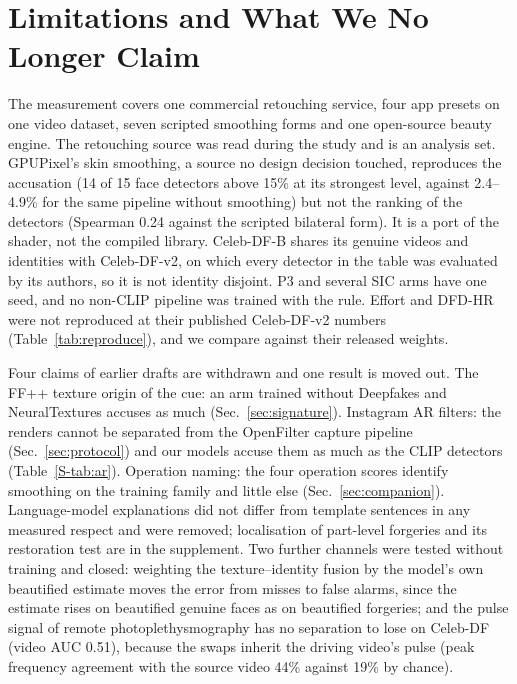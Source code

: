 \documentclass[journal]{IEEEtran}  %
\begin{document}
\section{Limitations and What We No Longer Claim}
\label{sec:limits}
The measurement covers one commercial retouching service, four app presets on one video dataset, seven scripted smoothing
forms and one open-source beauty engine. The retouching source was read during the study and is an analysis set. GPUPixel's
skin smoothing, a source no design decision touched, reproduces the accusation (14 of 15 face detectors above
15\% at its strongest level, against 2.4--4.9\% for the same pipeline without smoothing) but not the ranking of the detectors (Spearman
0.24 against the scripted bilateral form). It is a port of the shader, not the compiled library.
 Celeb-DF-B shares its genuine videos
and identities with Celeb-DF-v2, on which every detector in the table was evaluated by its authors, so it is not identity
disjoint. P3 and several SIC arms have one seed, and no non-CLIP pipeline was trained with the rule. Effort and DFD-HR were
not reproduced at their published Celeb-DF-v2 numbers (Table~\ref{tab:reproduce}), and we compare against their released
weights.

Four claims of earlier drafts are withdrawn and one result is moved out. The FF++ texture origin of the cue: an arm trained
without Deepfakes and NeuralTextures accuses as much (Sec.~\ref{sec:signature}). Instagram AR filters: the renders cannot be separated from the OpenFilter
capture pipeline (Sec.~\ref{sec:protocol}) and our models accuse them as much as the CLIP detectors (Table~\ref{S-tab:ar}).
Operation naming: the four operation scores identify smoothing on the training family and little else
(Sec.~\ref{sec:companion}). Language-model explanations did not differ from template sentences in any measured respect and
were removed; localisation of part-level forgeries and its restoration test are in the supplement.
Two further channels were tested without training and closed: weighting the texture--identity fusion by the model's own
beautified estimate moves the error from misses to false alarms, since the estimate rises on beautified genuine faces as on
beautified forgeries; and the pulse signal of remote photoplethysmography has no separation to lose on Celeb-DF (video AUC
0.51), because the swaps inherit the driving video's pulse (peak frequency agreement with the source video 44\% against
19\% by chance).
\end{document}
